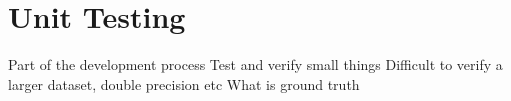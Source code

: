 \section{Unit Testing}
Part of the development process
Test and verify small things
Difficult to verify a larger dataset, double precision etc
What is ground truth